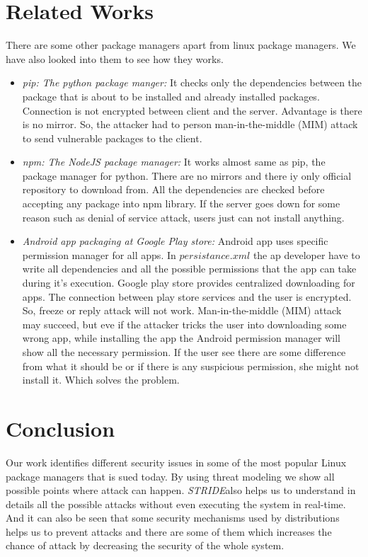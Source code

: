 \documentclass{IEEEtran}
\newcommand{\stride}{\emph{STRIDE}}
\begin{document}
\section{Related Works}
\label{sec:related-work}
There are some other package managers apart from linux package managers. We have also looked into them to see how they works.
\begin{itemize}
	\item \emph{pip: The python package manger:} It checks only the dependencies between the package that is about to be installed and already installed packages. Connection is not encrypted between client and the server. Advantage is there is no mirror. So, the attacker had to person man-in-the-middle (MIM) attack to send vulnerable packages to the client.
	\item \emph{npm: The NodeJS package manager:} It works almost same as pip, the package manager for python. There are no mirrors and there iy only official repository to download from. All the dependencies are checked before accepting any package into npm library. If the server goes down for some reason such as denial of service attack, users just can not install anything.
	\item \emph{Android app packaging at Google Play store:} Android app uses specific permission manager for all apps. In $persistance.xml$ the ap developer have to write all dependencies and all the possible permissions that the app can take during it's execution. Google play store provides centralized downloading for apps. The connection between play store services and the user is encrypted. So, freeze or reply attack will not work. Man-in-the-middle (MIM) attack may succeed, but eve if the attacker tricks the user into downloading some wrong app, while installing the app the Android permission manager will show all the necessary permission. If the user see there are some difference from what it should be or if there is any suspicious permission, she might not install it. Which solves the problem. 
\end{itemize}


\section{Conclusion}
\label{sec:conclusion}
Our work identifies different security issues in some of the most popular Linux package managers that is sued today. By using threat modeling we show all possible points where attack can happen. \stride also helps us to understand in details all the possible attacks without even executing the system in real-time. And it can also be seen that some security mechanisms used by distributions helps us to prevent attacks and there are some of them which increases the chance of attack by decreasing the security of the whole system.
\end{document}

